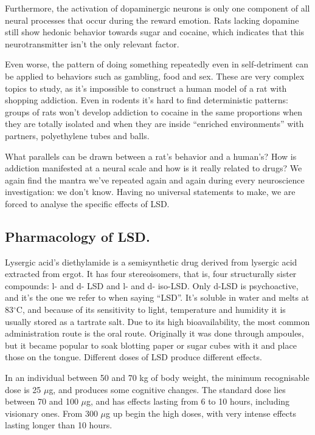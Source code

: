 Furthermore, the activation of dopaminergic neurons is only one component of all neural processes that occur during the reward emotion. Rats lacking dopamine still show hedonic behavior towards sugar and cocaine, which indicates that this neurotransmitter isn't the only relevant factor.

Even worse, the pattern of doing something repeatedly even in self-detriment can be applied to behaviors such as gambling, food and sex. These are very complex topics to study, as it's impossible to construct a human model of a rat with shopping addiction. Even in rodents it's hard to find deterministic patterns: groups of rats won't develop addiction to cocaine in the same proportions when they are totally isolated and when they are inside \enquote{enriched environments} with partners, polyethylene tubes and balls.

What parallels can be drawn between a rat's behavior and a human's? How is addiction manifested at a neural scale and how is it really related to drugs? We again find the mantra we've repeated again and again during every neuroscience investigation: we don't know. Having no universal statements to make, we are forced to analyse the specific effects of LSD.

\newpage

\subsection{Pharmacology of LSD.}

Lysergic acid's diethylamide is a semisynthetic drug derived from lysergic acid extracted from ergot. It has four stereoisomers, that is, four structurally sister compounds: l- and d- LSD and l- and d- iso-LSD. Only d-LSD is psychoactive, and it's the one we refer to when saying \enquote{LSD}. It's soluble in water and melts at 83$^\circ$C, and because of its sensitivity to light, temperature and humidity it is usually stored as a tartrate salt. Due to its high bioavailability, the most common administration route is the oral route. Originally it was done through ampoules, but it became popular to soak blotting paper or sugar cubes with it and place those on the tongue. Different doses of LSD produce different effects.

In an individual between 50 and 70 kg of body weight, the minimum recognisable dose is 25 $\mu$g, and produces some cognitive changes. The standard dose lies between 70 and 100 $\mu$g, and has effects lasting from 6 to 10 hours, including visionary ones. From 300 $\mu$g up begin the high doses, with very intense effects lasting longer than 10 hours.

